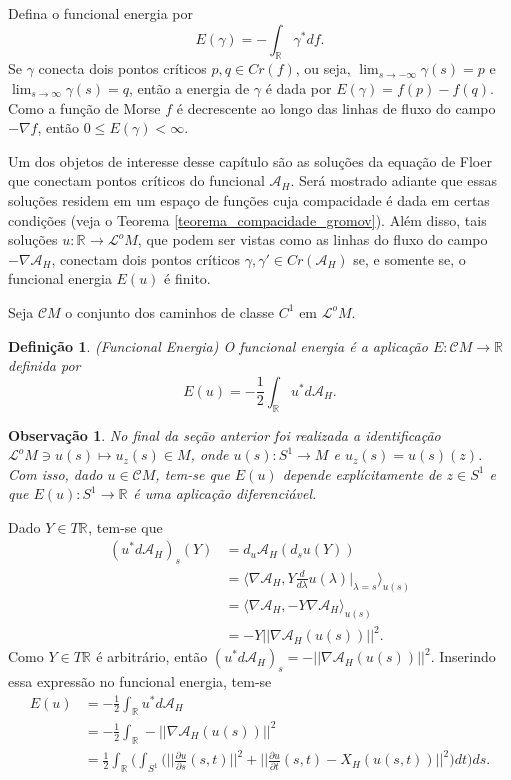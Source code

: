 \documentclass[12pt]{book}
\newtheorem{definicao}[teorema]{Definição}
\newtheorem{observacao}[teorema]{Observação}
\newcommand{\bigparenteses}[1]{\Big( #1 \Big) }
\newcommand{\campohamiltoniano}[1]{X_{H}(#1)}
\newcommand{\circulo}{S^{1}}
\newcommand{\derivada}[2]{\frac{d #1}{d #2}}
\newcommand{\derivadaparcial}[2]{\frac{\partial #1}{\partial #2}}
\newcommand{\funcionalH}{\mathcal{A}_{H}}
\newcommand{\gradiente}{\nabla f}
\newcommand{\gradientefuncional}{\nabla \funcionalH}
\newcommand{\norma}[1]{||#1||}
\newcommand{\normagrande}[1]{\Big|\Big|#1\Big|\Big|}
\newcommand{\pontoscriticos}[1]{\textit{Cr}(#1)}
\newcommand{\produtointerno}[2]{\langle #1, #2 \rangle}
\newcommand{\real}[1]{\mathbb{R}^{#1}}
\newcommand{\reta}{\real{}}
\newcommand{\lacocontrateis}{\mathcal{L}^{o}M}
\newcommand{\cilindrosLM}{\mathcal{C}M}
\begin{document}
	Defina o funcional energia por
	$$
	E(\gamma)= -\int_{\reta}\gamma^{*} df.
	$$
	Se $\gamma$ conecta dois pontos críticos $p,q\in \pontoscriticos{f}$, ou seja, $\lim_{s\to -\infty}\gamma(s)=p$ e $\lim_{s\to \infty}\gamma(s)=q$, então a energia de $\gamma$ é dada por $E(\gamma) = f(p) -f(q)$. Como a função de Morse $f$ é decrescente ao longo das linhas de fluxo do campo $-\gradiente$, então $0\leq E(\gamma)<\infty$.
	
	Um dos objetos de interesse desse capítulo são as soluções da equação de Floer que conectam pontos críticos do funcional $\funcionalH$. Será mostrado adiante que essas soluções residem em um espaço de funções cuja compacidade é dada em certas condições (veja o Teorema \ref{teorema_compacidade_gromov}). Além disso, tais soluções $u:\reta\to \lacocontrateis$, que podem ser vistas como as linhas do fluxo do campo $-\gradientefuncional$, conectam dois pontos críticos $\gamma, \gamma'\in \pontoscriticos{\funcionalH}$ se, e somente se, o funcional energia $E(u)$ é finito.
	
	Seja $\cilindrosLM$ o conjunto dos caminhos de classe $C^{1}$ em $\lacocontrateis$.
	
	\begin{definicao}
		(Funcional Energia) O funcional energia é a aplicação $E: \cilindrosLM \to \reta$ definida por
		$$
		E(u) = -\frac{1}{2}\int_{\reta}u^{*}d\funcionalH.
		$$
	\end{definicao}
	
	\begin{observacao}
		No final da seção anterior foi realizada a identificação $\lacocontrateis \ni u(s) \mapsto u_{z}(s)\in M $, onde $u(s):\circulo\to M$ e $u_{z}(s) = u(s)(z)$.
		Com isso, dado $u \in \cilindrosLM$, tem-se que $E(u)$ depende explícitamente de $z \in \circulo$ e que $E(u):\circulo\to \reta$ é uma aplicação diferenciável.
	\end{observacao}
	
	Dado $Y \in T\reta$, tem-se que
	$$
	\begin{aligned}
	(u^{*}d\funcionalH)_{s}(Y) &= d_{u}\funcionalH(d_{s}u(Y))
	\\
	&=\produtointerno{\gradientefuncional}{Y\derivada{}{\lambda}u(\lambda)|_{\lambda=s}}_{u(s)}
	\\
	&=\produtointerno{\gradientefuncional}{-Y\gradientefuncional}_{u(s)}
	\\
	&=-Y\norma{\gradientefuncional(u(s))}^{2}.
	\end{aligned}
	$$
	Como $Y\in T\reta$ é arbitrário, então $(u^{*}d\funcionalH)_{s} = -\norma{\gradientefuncional(u(s))}^{2}$. Inserindo essa expressão no funcional energia, tem-se
	$$
	\begin{aligned}
			E(u)
			&=-\frac{1}{2}\int_{\reta}u^{*}d\funcionalH 
			\\
			&= -\frac{1}{2}\int_{\reta}-\norma{\gradientefuncional(u(s))}^{2}
			\\
			&= \frac{1}{2}\int_{\reta}\bigparenteses{ \int_{\circulo} \bigparenteses{\normagrande{\derivadaparcial{u}{s}(s,t)}^{2} + \normagrande{\derivadaparcial{u}{t}(s,t) - \campohamiltoniano{u(s,t)}}^{2}} dt }ds.
	\end{aligned}
	$$
	
\end{document}
